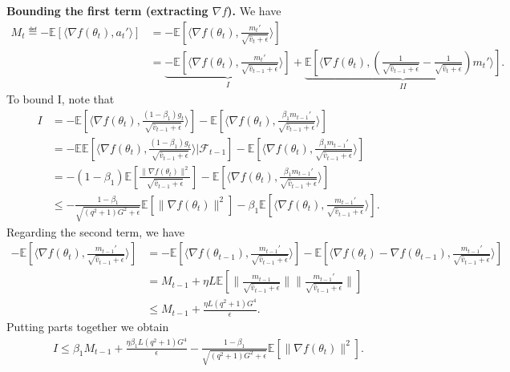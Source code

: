 \documentclass[11pt]{article}
\begin{document}
\textbf{Bounding the first term (extracting $\nabla f$).} We have
\begin{align*}
    M_t\eqdef -\mathbb E[\langle \nabla f(\theta_t), a_t'\rangle]&=-\mathbb E[\langle \nabla f(\theta_t), \frac{m_t'}{\sqrt{\hat v_t+\epsilon}}\rangle]\\
    &=\underbrace{-\mathbb E[\langle \nabla f(\theta_t), \frac{m_t'}{\sqrt{\hat v_{t-1}+\epsilon}} \rangle]}_{I}+\underbrace{\mathbb E[\langle \nabla f(\theta_t), (\frac{1}{\sqrt{\hat v_{t-1}+\epsilon}}-\frac{1}{\sqrt{\hat v_t+\epsilon}})m_t' \rangle]}_{II}.
\end{align*}
To bound I, note that
\begin{align*}
    I&=-\mathbb E[\langle \nabla f(\theta_t), \frac{(1-\beta_1)g_t}{\sqrt{\hat v_{t-1}+\epsilon}} \rangle] -\mathbb E[\langle \nabla f(\theta_t), \frac{\beta_1 m_{t-1}'}{\sqrt{\hat v_{t-1}+\epsilon}} \rangle]\\
    &=-\mathbb E\mathbb E[\langle \nabla f(\theta_t), \frac{(1-\beta_1)g_t}{\sqrt{\hat v_{t-1}+\epsilon}} \rangle|\mathcal F_{t-1}] -\mathbb E[\langle \nabla f(\theta_t), \frac{\beta_1 m_{t-1}'}{\sqrt{\hat v_{t-1}+\epsilon}} \rangle]\\
    &=-(1-\beta_1)\mathbb E[\frac{\|\nabla f(\theta_t)\|^2}{\sqrt{\hat v_{t-1}+\epsilon}}] - \mathbb E[\langle \nabla f(\theta_t), \frac{\beta_1 m_{t-1}'}{\sqrt{\hat v_{t-1}+\epsilon}} \rangle]\\
    &\leq -\frac{1-\beta_1}{\sqrt{(q^2+1)G^2+\epsilon}}\mathbb E[\|\nabla f(\theta_t)\|^2]- \beta_1\mathbb E[\langle \nabla f(\theta_t), \frac{ m_{t-1}'}{\sqrt{\hat v_{t-1}+\epsilon}} \rangle].
\end{align*}
Regarding the second term, we have
\begin{align*}
    - \mathbb E[\langle \nabla f(\theta_t), \frac{ m_{t-1}'}{\sqrt{\hat v_{t-1}+\epsilon}} \rangle]&=-\mathbb E[\langle\nabla f(\theta_{t-1}), \frac{ m_{t-1}'}{\sqrt{\hat v_{t-1}+\epsilon}} \rangle]- \mathbb E[\langle \nabla f(\theta_t)-\nabla f(\theta_{t-1}), \frac{ m_{t-1}'}{\sqrt{\hat v_{t-1}+\epsilon}} \rangle]\\
    &=M_{t-1}+ \eta L\mathbb E[\|\frac{m_{t-1}}{\sqrt{\hat v_{t-1}+\epsilon}}\| \|\frac{m_{t-1}'}{\sqrt{\hat v_{t-1}+\epsilon}}\|]\\
    &\leq M_{t-1}+\frac{\eta L(q^2+1)G^4}{\epsilon}.
\end{align*}
Putting parts together we obtain
\begin{align*}
    I\leq \beta_1 M_{t-1}+\frac{\eta \beta_1 L(q^2+1)G^4}{\epsilon}-\frac{1-\beta_1}{\sqrt{(q^2+1)G^2+\epsilon}}\mathbb E[\|\nabla f(\theta_t)\|^2].
\end{align*}
\end{document}
